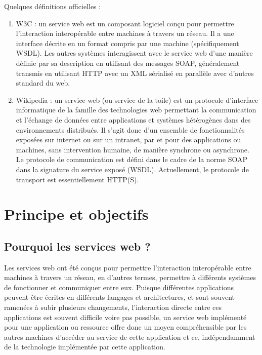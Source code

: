 Quelques définitions officielles :
\begin{enumerate}
	\item W3C :
	      un service web est un composant logiciel conçu pour permettre l'interaction interopérable entre machines à travers un réseau. Il a une interface décrite en un format compris par une machine (spécifiquement WSDL). Les autres systèmes interagissent avec le service web d'une manière définie par sa description en utilisant des messages SOAP, généralement transmis en utilisant HTTP avec un XML sérialisé en parallèle avec d'autres standard du web.\cite{W3}
	\item Wikipedia : un service web (ou service de la toile) est un protocole d'interface informatique de la famille des technologies web permettant la communication et l'échange de données entre applications et systèmes hétérogènes dans des environnements distribués. Il s'agit donc d'un ensemble de fonctionnalités exposées sur internet ou sur un intranet, par et pour des applications ou machines, sans intervention humaine, de manière synchrone ou asynchrone. Le protocole de communication est défini dans le cadre de la norme SOAP dans la signature du service exposé (WSDL). Actuellement, le protocole de transport est essentiellement HTTP(S).\cite{Wikipedia}
\end{enumerate}

\section{Principe et objectifs}
\subsection{Pourquoi les services web ?}
Les services web ont été conçus pour permettre l'interaction interopérable entre machines à travers un réseau, en d'autres termes, permettre à différents systèmes de fonctionner et communiquer entre eux.\newline
Puisque différentes applications peuvent être écrites en différents langages et architectures, et sont souvent ramenées à subir plusieurs changements, l’interaction directe entre ces applications est souvent difficile voire pas possible, un service web implémenté pour une application ou ressource offre donc un moyen compréhensible par les autres machines d'accéder au service de cette application et ce, indépendamment de la technologie implémentée par cette application.
\cite{refTutorialPointsWS}
